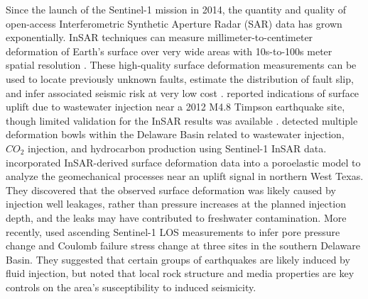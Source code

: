 Since the launch of the Sentinel-1 mission in 2014, the quantity and quality of open-access Interferometric Synthetic Aperture Radar (SAR) data has grown exponentially. InSAR techniques can measure millimeter-to-centimeter deformation of Earth's surface over very wide areas with 10s-to-100s meter spatial resolution \citep{Massonnet1993DisplacementFieldLanders, Buergmann2000SyntheticApertureRadar}. These high-quality surface deformation measurements can be used to locate previously unknown faults, estimate the distribution of fault slip, and infer associated seismic risk at very low cost \citep{Segall2010EarthquakeVolcanoDeformation, Elliott2016RoleSpaceBased, Huang2017FaultGeometryInversion}. \cite{Shirzaei2016SurfaceUpliftTime} reported indications of surface uplift due to wastewater injection near a 2012 M4.8 Timpson earthquake site, though limited validation for the InSAR results was available \citep{Semple2017IncompleteInventorySuspected}.
\cite{Kim2018AssociationLocalizedGeohazards} detected multiple deformation bowls within the Delaware Basin related to wastewater injection, $CO_2$ injection, and hydrocarbon production using Sentinel-1 InSAR data. \cite{Zheng2019WastewaterLeakageWest} incorporated InSAR-derived surface deformation data into a poroelastic model to analyze the geomechanical processes near an uplift signal in northern West Texas. They discovered that the observed surface deformation was likely caused by injection well leakages, rather than pressure increases at the planned injection depth, and the leaks may have contributed to freshwater contamination. More recently, \cite{Deng2020SurfaceDeformationInduced} used ascending Sentinel-1 LOS measurements to infer pore pressure change and Coulomb failure stress change at three sites in the southern Delaware Basin. They suggested that certain groups of earthquakes are likely induced by fluid injection, but noted that local rock structure and media properties are key controls on the area's susceptibility to induced seismicity.



